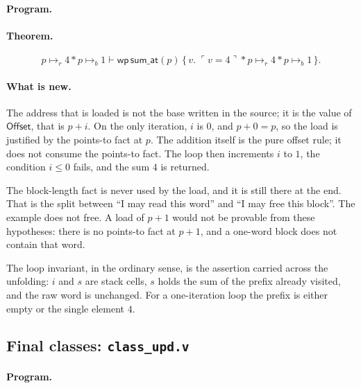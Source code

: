 \documentclass[11pt]{article}
\newcommand{\ptsr}{\mathrel{\mapsto_{r}}}
\newcommand{\ptsb}{\mathrel{\mapsto_{b}}}
\newcommand{\sep}{\mathbin{*}}
\newcommand{\Wpre}{\mathsf{wp}}
\newcommand{\pure}[1]{\ulcorner #1 \urcorner}
\begin{document}
\paragraph{Program.}\mbox{}\par


\paragraph{Theorem.}
\[
p \ptsr 4 \sep p \ptsb 1
\vdash
\Wpre\,\mathsf{sum\_at}(p)\,
\bigl\{\,v.\;
  \pure{v=4}
  \sep p \ptsr 4
  \sep p \ptsb 1
\,\bigr\}.
\]

\paragraph{What is new.}
The address that is loaded is not the base written in the source; it is the value of \(\mathsf{Offset}\), that is \(p+i\).
On the only iteration, \(i\) is \(0\), and \(p+0=p\), so the load is justified by the points-to fact at \(p\).
The addition itself is the pure offset rule; it does not consume the points-to fact.
The loop then increments \(i\) to \(1\), the condition \(i\le 0\) fails, and the sum \(4\) is returned.

The block-length fact is never used by the load, and it is still there at the end.
That is the split between ``I may read this word'' and ``I may free this block''.
The example does not free.
A load of \(p+1\) would not be provable from these hypotheses: there is no points-to fact at \(p+1\), and a one-word block does not contain that word.

The loop invariant, in the ordinary sense, is the assertion carried across the unfolding:
\(i\) and \(s\) are stack cells, \(s\) holds the sum of the prefix already visited, and the raw word is unchanged.
For a one-iteration loop the prefix is either empty or the single element \(4\).

\subsection{Final classes: \texttt{class\_upd.v}}

\paragraph{Program.}\mbox{}\par

\end{document}
